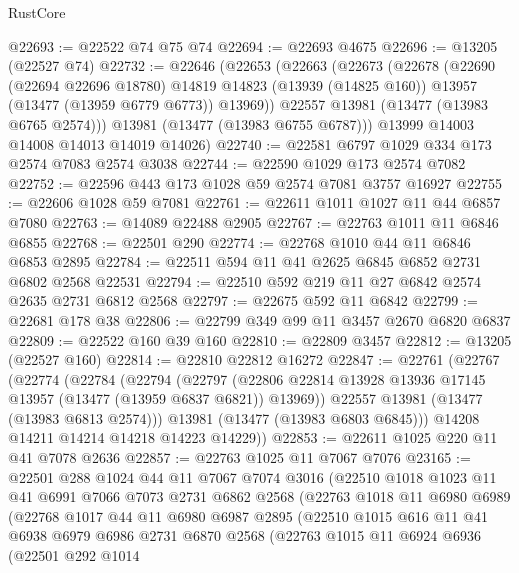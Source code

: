 \begin{lexlean}{RustCore}
\begin{coremodule}
@22693 := @22522 @74 @75 @74
@22694 := @22693 @4675
@22696 := @13205 (@22527 @74)
@22732 := @22646
    (@22653
      (@22663
        (@22673
          (@22678
            (@22690
              (@22694 @22696 @18780)
              @14819
              @14823
              (@13939 (@14825 @160))
              @13957
              (@13477 (@13959 @6779 @6773))
              @13969))
          @22557
          @13981
          (@13477 (@13983 @6765 @2574)))
        @13981
        (@13477 (@13983 @6755 @6787)))
      @13999
      @14003
      @14008
      @14013
      @14019
      @14026)
@22740 := @22581 @6797 @1029 @334 @173 @2574 @7083 @2574 @3038
@22744 := @22590 @1029 @173 @2574 @7082
@22752 := @22596 @443 @173 @1028 @59 @2574 @7081 @3757 @16927
@22755 := @22606 @1028 @59 @7081
@22761 := @22611 @1011 @1027 @11 @44 @6857 @7080
@22763 := @14089 @22488 @2905
@22767 := @22763 @1011 @11 @6846 @6855
@22768 := @22501 @290
@22774 := @22768 @1010 @44 @11 @6846 @6853 @2895
@22784 := @22511 @594 @11 @41 @2625 @6845 @6852 @2731 @6802 @2568 @22531
@22794 := @22510 @592 @219 @11 @27 @6842 @2574 @2635 @2731 @6812 @2568
@22797 := @22675 @592 @11 @6842
@22799 := @22681 @178 @38
@22806 := @22799 @349 @99 @11 @3457 @2670 @6820 @6837
@22809 := @22522 @160 @39 @160
@22810 := @22809 @3457
@22812 := @13205 (@22527 @160)
@22814 := @22810 @22812 @16272
@22847 := @22761
    (@22767
      (@22774
        (@22784
          (@22794
            (@22797
              (@22806 @22814 @13928 @13936 @17145 @13957 (@13477 (@13959 @6837 @6821)) @13969))
            @22557
            @13981
            (@13477 (@13983 @6813 @2574)))
          @13981
          (@13477 (@13983 @6803 @6845)))
        @14208
        @14211
        @14214
        @14218
        @14223
        @14229))
@22853 := @22611 @1025 @220 @11 @41 @7078 @2636
@22857 := @22763 @1025 @11 @7067 @7076
@23165 := @22501
    @288
    @1024
    @44
    @11
    @7067
    @7074
    @3016
    (@22510
      @1018
      @1023
      @11
      @41
      @6991
      @7066
      @7073
      @2731
      @6862
      @2568
      (@22763
        @1018
        @11
        @6980
        @6989
        (@22768
          @1017
          @44
          @11
          @6980
          @6987
          @2895
          (@22510
            @1015
            @616
            @11
            @41
            @6938
            @6979
            @6986
            @2731
            @6870
            @2568
            (@22763
              @1015
              @11
              @6924
              @6936
              (@22501
                @292
                @1014

\end{coremodule}
\end{lexlean}
